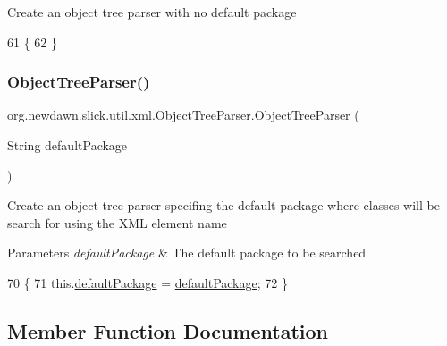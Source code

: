 Create an object tree parser with no default package 
\begin{DoxyCode}
61                               \{
62     \}
\end{DoxyCode}
\mbox{\label{classorg_1_1newdawn_1_1slick_1_1util_1_1xml_1_1_object_tree_parser_a8e6ee678892b8b9f6b2547c12b6a0317}} 
\subsubsection{\texorpdfstring{Object\+Tree\+Parser()}{ObjectTreeParser()}\hspace{0.1cm}{\footnotesize\ttfamily [2/2]}}
{\footnotesize\ttfamily org.\+newdawn.\+slick.\+util.\+xml.\+Object\+Tree\+Parser.\+Object\+Tree\+Parser (\begin{DoxyParamCaption}\item[{String}]{default\+Package }\end{DoxyParamCaption})\hspace{0.3cm}{\ttfamily [inline]}}

Create an object tree parser specifing the default package where classes will be search for using the X\+ML element name


\begin{DoxyParams}{Parameters}
{\em default\+Package} & The default package to be searched \\
\hline
\end{DoxyParams}

\begin{DoxyCode}
70                                                    \{
71         this.\mbox{\hyperlink{classorg_1_1newdawn_1_1slick_1_1util_1_1xml_1_1_object_tree_parser_ab71da775b688ffcb01dd17456a4013bb}{defaultPackage}} = \mbox{\hyperlink{classorg_1_1newdawn_1_1slick_1_1util_1_1xml_1_1_object_tree_parser_ab71da775b688ffcb01dd17456a4013bb}{defaultPackage}};
72     \}
\end{DoxyCode}


\subsection{Member Function Documentation}
\mbox{\label{classorg_1_1newdawn_1_1slick_1_1util_1_1xml_1_1_object_tree_parser_a03026019c9ab19b319fb0ef0ce32217e}} 
